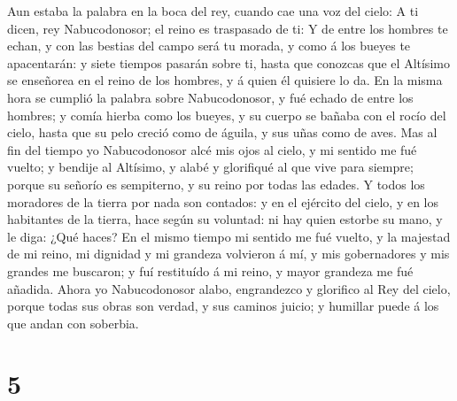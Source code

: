  Aun estaba la palabra en la boca del rey, cuando cae una
voz del cielo: A ti dicen, rey Nabucodonosor; el reino es traspasado de
ti:  Y de entre los hombres te echan, y con las bestias del
campo será tu morada, y como á los bueyes te apacentarán: y siete
tiempos pasarán sobre ti, hasta que conozcas que el Altísimo se
enseñorea en el reino de los hombres, y á quien él quisiere lo da.
 En la misma hora se cumplió la palabra sobre
Nabucodonosor, y fué echado de entre los hombres; y comía hierba como
los bueyes, y su cuerpo se bañaba con el rocío del cielo, hasta que su
pelo creció como de águila, y sus uñas como de aves.  Mas
al fin del tiempo yo Nabucodonosor alcé mis ojos al cielo, y mi sentido
me fué vuelto; y bendije al Altísimo, y alabé y glorifiqué al que vive
para siempre; porque su señorío es sempiterno, y su reino por todas las
edades.  Y todos los moradores de la tierra por nada son
contados: y en el ejército del cielo, y en los habitantes de la tierra,
hace según su voluntad: ni hay quien estorbe su mano, y le diga: ¿Qué
haces?  En el mismo tiempo mi sentido me fué vuelto, y la
majestad de mi reino, mi dignidad y mi grandeza volvieron á mí, y mis
gobernadores y mis grandes me buscaron; y fuí restituído á mi reino, y
mayor grandeza me fué añadida.  Ahora yo Nabucodonosor
alabo, engrandezco y glorifico al Rey del cielo, porque todas sus obras
son verdad, y sus caminos juicio; y humillar puede á los que andan con
soberbia.

\hypertarget{section-4}{%
\section{5}\label{section-4}}

